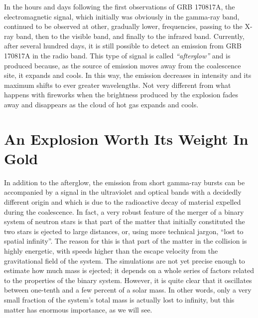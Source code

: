 In the hours and days following the first observations of GRB
170817A, the electromagnetic signal, which initially was obviously in
the gamma-ray band, continued to be observed at other, gradually lower, frequencies,
passing to the X-ray band, then to the visible band, and finally to
the infrared band. Currently, after several hundred days, it is still possible to detect
an emission from GRB 170817A in the radio band. This type of signal is called
\emph{``afterglow}\emph{''} and is produced because, as the source of
emission moves away from the coalescence site, it expands and cools. In this way, the
emission decreases in intensity and its maximum shifts to ever greater wavelengths. Not
very different from what happens with fireworks when the brightness produced by the
explosion fades away and disappears as the cloud of hot gas expands and cools.

\section{An Explosion Worth Its Weight In Gold}\label{sec:08-gold}

In addition to the afterglow, the emission from short gamma-ray
bursts can be accompanied by a signal in the ultraviolet and optical
bands with a decidedly different origin and which is due to the radioactive decay of
material expelled during the coalescence. In fact, a very robust feature of the merger
of a binary system of neutron stars is that part of the matter that initially
constituted the two stars is ejected to large distances, or, using more technical
jargon, ``lost to spatial infinity''. The reason for this is that part of the matter in
the collision is highly energetic, with speeds higher than the escape velocity from the
gravitational field of the system. The simulations are not yet precise enough to
estimate how much mass is ejected; it depends on a whole series of factors related to
the properties of the binary system. However, it is quite clear that it oscillates
between one-tenth and a few percent of a solar mass. In other words, only a very small
fraction of the system's total mass is actually lost to infinity, but this matter has
enormous importance, as we will see.

